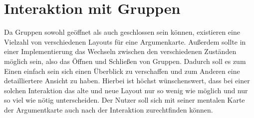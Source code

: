 

\section{Interaktion mit Gruppen}
Da Gruppen sowohl geöffnet als auch geschlossen sein können, existieren eine Vielzahl von verschiedenen Layouts für eine Argumenkarte.
Außerdem sollte in einer Implementierung das Wechseln zwischen den verschiedenen Zuständen möglich sein, also das Öffnen und Schließen von Gruppen. 
Dadurch soll es zum Einen einfach sein sich einen Überblick zu verschaffen und zum Anderen eine detailliertere Ansicht zu haben.
Hierbei ist höchst wünschenswert, dass bei einer solchen Interaktion das alte und neue Layout nur so wenig wie möglich und nur so viel wie nötig unterscheiden. 
Der Nutzer soll sich mit seiner mentalen Karte der Argumentkarte auch nach der Interaktion zurechtfinden können.

